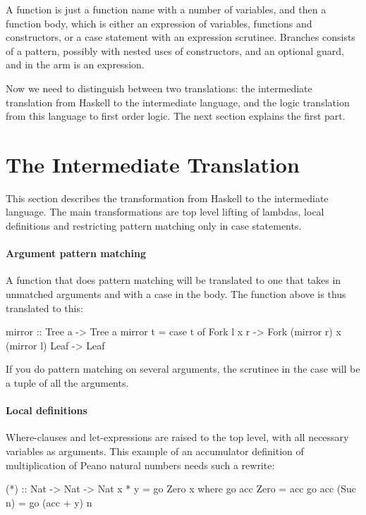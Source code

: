 A function is just a function name with a number of variables, and
then a function body, which is either an expression of variables,
functions and constructors, or a case statement with an expression
scrutinee. Branches consists of a pattern, possibly with nested uses
of constructors, and an optional guard, and in the arm is an
expression.

Now we need to distinguish between two translations: the intermediate
translation from Haskell to the intermediate language, and the logic
translation from this language to first order logic. The next section
explains the first part.

\pagebreak
\section{The Intermediate Translation}

This section describes the transformation from Haskell to the
intermediate language. The main transformations are top level lifting
of lambdas, local definitions and restricting pattern matching only in
case statements.

\paragraph{Argument pattern matching} A function that does pattern matching will be translated to one that
takes in unmatched arguments and with a case in the body. The
 function above is thus translated to this:

\begin{code}
mirror :: Tree a -> Tree a
mirror t = case t of
   Fork l x r -> Fork (mirror r) x (mirror l)
   Leaf       -> Leaf
\end{code}

\noindent
If you do pattern matching on several arguments, the scrutinee in the
case will be a tuple of all the arguments.

\paragraph{Local definitions} Where-clauses and let-expressions are
raised to the top level, with all necessary variables as
arguments. This example of an accumulator definition of multiplication
of Peano natural numbers needs such a rewrite:

\begin{code}
(*) :: Nat -> Nat -> Nat
x * y = go Zero x
  where
    go acc Zero    = acc
    go acc (Suc n) = go (acc + y) n
\end{code}

